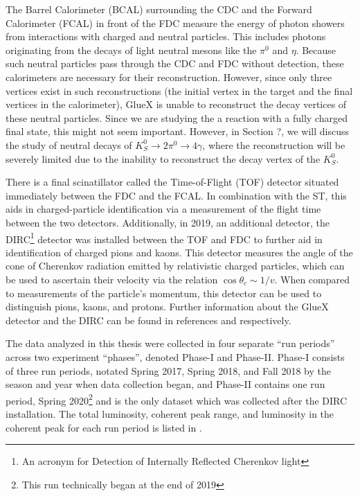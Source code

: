 The Barrel Calorimeter (BCAL) surrounding the CDC and the Forward Calorimeter (FCAL) in front of the FDC measure the energy of photon showers from interactions with charged and neutral particles. This includes photons originating from the decays of light neutral mesons like the $\pi^0$ and $\eta$. Because such neutral particles pass through the CDC and FDC without detection, these calorimeters are necessary for their reconstruction. However, since only three vertices exist in such reconstructions (the initial vertex in the target and the final vertices in the calorimeter), GlueX is unable to reconstruct the decay vertices of these neutral particles. Since we are studying the a reaction with a fully charged final state, this might not seem important. However, in {\color{red}Section ?}, we will discuss the study of neutral decays of $K_S^0\to 2\pi^0 \to 4\gamma$, where the reconstruction will be severely limited due to the inability to reconstruct the decay vertex of the $K_S^0$.

There is a final scinatillator called the Time-of-Flight (TOF) detector situated immediately between the FDC and the FCAL. In combination with the ST, this aids in charged-particle identification via a measurement of the flight time between the two detectors. Additionally, in 2019, an additional detector, the DIRC\footnote{An acronym for Detection of Internally Reflected Cherenkov light} detector was installed between the TOF and FDC to further aid in identification of charged pions and kaons. This detector measures the angle of the cone of Cherenkov radiation emitted by relativistic charged particles, which can be used to ascertain their velocity via the relation $\cos\theta_c \sim 1/v$. When compared to measurements of the particle's momentum, this detector can be used to distinguish pions, kaons, and protons. Further information about the GlueX detector and the DIRC can be found in references \cite{adhikari_gluex_2021} and \cite{ali_installation_2020} respectively.

The data analyzed in this thesis were collected in four separate ``run periods'' across two experiment ``phases'', denoted Phase-I and Phase-II. Phase-I consists of three run periods, notated Spring 2017, Spring 2018, and Fall 2018 by the season and year when data collection began, and Phase-II contains one run period, Spring 2020\footnote{This run technically began at the end of 2019} and is the only dataset which was collected after the DIRC installation. The total luminosity, coherent peak range, and luminosity in the coherent peak for each run period is listed in .


